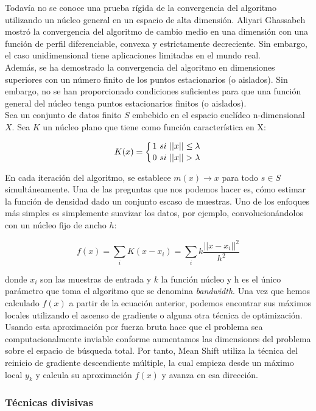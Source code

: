 \documentclass[a4paper, 20pt]{article}
\begin{document}
Todavía no se conoce una prueba rígida de la convergencia del algoritmo utilizando un núcleo general en un espacio de alta dimensión. Aliyari Ghassabeh mostró la convergencia del algoritmo de cambio medio en una dimensión con una función de perfil diferenciable, convexa y estrictamente decreciente. Sin embargo, el caso unidimensional tiene aplicaciones limitadas en el mundo real.\\

Además, se ha demostrado la convergencia del algoritmo en dimensiones superiores con un número finito de los puntos estacionarios (o aislados). Sin embargo, no se han proporcionado condiciones suficientes para que una función general del núcleo tenga puntos estacionarios finitos (o aislados).\\

Sea un conjunto de datos finito $S$ embebido en el espacio euclídeo n-dimensional $X$. Sea $K$ un núcleo plano que tiene como función característica en X:

$$K(x)=\left\{
1 \ si \ ||x||\leq \lambda \atop
0 \ si \ ||x||> \lambda
\right.$$

En cada iteración del algoritmo, se establece $m(x)\rightarrow x$ para todo $s\in S$ simultáneamente. Una de las preguntas que nos podemos hacer es, cómo estimar la función de densidad dado un conjunto escaso de muestras. Uno de los enfoques más simples es simplemente suavizar los datos, por ejemplo, convolucionándolos con un núcleo fijo de ancho $h$:

$$f(x)=\sum_i K(x-x_i)=\sum_i k\dfrac{||x-x_i||^2}{h^2}$$

donde $x_i$ son las muestras de entrada y $k$ la función núcleo y h es el único parámetro que toma el algoritmo que se denomina \textit{bandwidth}. Una vez que hemos calculado $f(x)$ a partir de la ecuación anterior, podemos encontrar sus máximos locales utilizando el ascenso de gradiente o alguna otra técnica de optimización.\\

Usando esta aproximación por fuerza bruta hace que el problema sea computacionalmente inviable conforme aumentamos las dimensiones del problema sobre el espacio de búsqueda total. Por tanto, Mean Shift utiliza la técnica del reinicio de gradiente descendiente múltiple, la cual empieza desde un máximo local $y_k$ y calcula su aproximación $f(x)$ y avanza en esa dirección.

\subsubsection{Técnicas divisivas}
\end{document}

